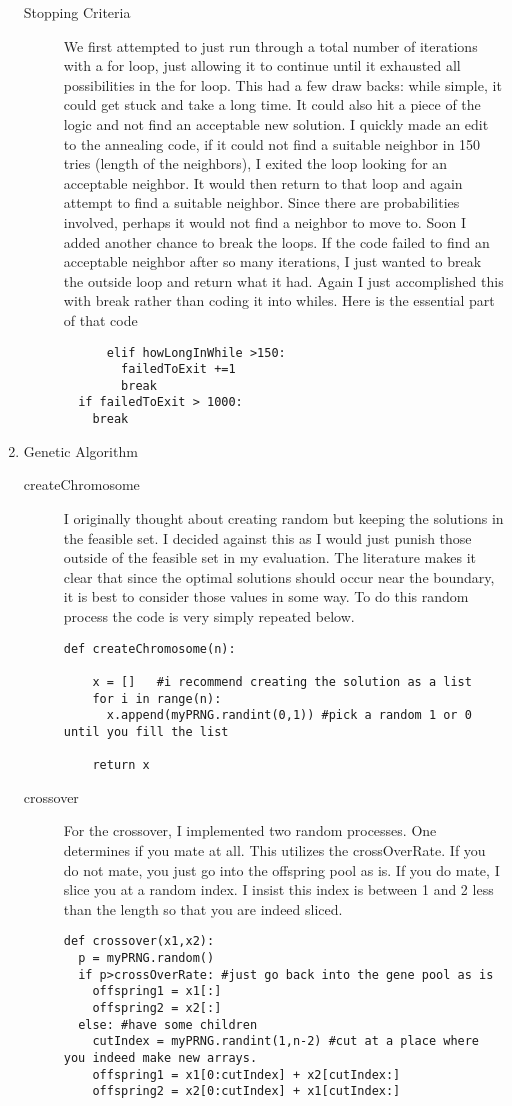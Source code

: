 \documentclass[11pt]{article}
\begin{document}
\begin{enumerate}
\begin{description}
\item[Stopping Criteria]  We first attempted to just run through a total number of iterations with a for loop, just allowing it to continue until it exhausted all possibilities in the for loop.  This had a few draw backs:  while simple, it could get stuck and take a long time.  It could also hit a piece of the logic and not find an acceptable new solution.  I quickly made an edit to the annealing code, if it could not find a suitable neighbor in 150 tries (length of the neighbors), I exited the loop looking for an acceptable neighbor.  It would then return to that loop and again attempt to find a suitable neighbor.  Since there are probabilities involved, perhaps it would not find a neighbor to move to. Soon I added another chance to break the loops.  If the code failed to find an acceptable neighbor after so many iterations, I just wanted to break the outside loop and return what it had.  Again I just accomplished this with break rather than coding it into whiles.  Here is the essential part of that code
\begin{verbatim}
      elif howLongInWhile >150:
        failedToExit +=1
        break
  if failedToExit > 1000:
    break
\end{verbatim}


\end{description}

\item Genetic Algorithm
\begin{description}
\item[createChromosome]  I originally thought about creating random but keeping the solutions in the feasible set.  I decided against this as I would just punish those outside of the feasible set in my evaluation.  The literature makes it clear that since the optimal solutions should occur near the boundary, it is best to consider those values in some way.  To do this random process the code is very simply repeated below.
\begin{verbatim}
def createChromosome(n):

    x = []   #i recommend creating the solution as a list
    for i in range(n):
      x.append(myPRNG.randint(0,1)) #pick a random 1 or 0 until you fill the list

    return x
\end{verbatim}

\item[crossover] For the crossover, I implemented two random processes.  One determines if you mate at all.  This utilizes the crossOverRate.  If you do not mate, you just go into the offspring pool as is.  If you do mate, I slice you at a random index.  I insist this index is between 1 and 2 less than the length so that you are indeed sliced.
\begin{verbatim}
def crossover(x1,x2):
  p = myPRNG.random()
  if p>crossOverRate: #just go back into the gene pool as is
    offspring1 = x1[:]
    offspring2 = x2[:]
  else: #have some children
    cutIndex = myPRNG.randint(1,n-2) #cut at a place where you indeed make new arrays. 
    offspring1 = x1[0:cutIndex] + x2[cutIndex:]
    offspring2 = x2[0:cutIndex] + x1[cutIndex:]



\end{verbatim}
\end{description}
\end{enumerate}
\end{document}
